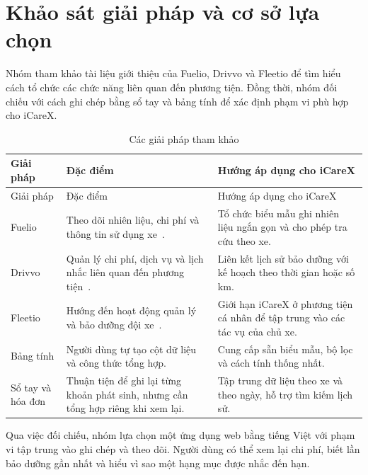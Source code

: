 \section{Khảo sát giải pháp và cơ sở lựa chọn}
Nhóm tham khảo tài liệu giới thiệu của Fuelio, Drivvo và Fleetio để tìm hiểu cách tổ chức các chức năng liên quan đến phương tiện. Đồng thời, nhóm đối chiếu với cách ghi chép bằng sổ tay và bảng tính để xác định phạm vi phù hợp cho iCareX.
\begin{smalltable}\begin{longtable}{L{2.2cm}L{5.8cm}L{6.8cm}}
\caption{Các giải pháp tham khảo}\\\toprule Giải pháp & Đặc điểm & Hướng áp dụng cho iCareX\\\midrule\endfirsthead
\toprule Giải pháp & Đặc điểm & Hướng áp dụng cho iCareX\\\midrule\endhead
Fuelio & Theo dõi nhiên liệu, chi phí và thông tin sử dụng xe~\cite{fuelio}. & Tổ chức biểu mẫu ghi nhiên liệu ngắn gọn và cho phép tra cứu theo xe.\\
Drivvo & Quản lý chi phí, dịch vụ và lịch nhắc liên quan đến phương tiện~\cite{drivvo}. & Liên kết lịch sử bảo dưỡng với kế hoạch theo thời gian hoặc số km.\\
Fleetio & Hướng đến hoạt động quản lý và bảo dưỡng đội xe~\cite{fleetio}. & Giới hạn iCareX ở phương tiện cá nhân để tập trung vào các tác vụ của chủ xe.\\
Bảng tính & Người dùng tự tạo cột dữ liệu và công thức tổng hợp. & Cung cấp sẵn biểu mẫu, bộ lọc và cách tính thống nhất.\\
Sổ tay và hóa đơn & Thuận tiện để ghi lại từng khoản phát sinh, nhưng cần tổng hợp riêng khi xem lại. & Tập trung dữ liệu theo xe và theo ngày, hỗ trợ tìm kiếm lịch sử.\\\bottomrule
\end{longtable}\end{smalltable}
Qua việc đối chiếu, nhóm lựa chọn một ứng dụng web bằng tiếng Việt với phạm vi tập trung vào ghi chép và theo dõi. Người dùng có thể xem lại chi phí, biết lần bảo dưỡng gần nhất và hiểu vì sao một hạng mục được nhắc đến hạn.

